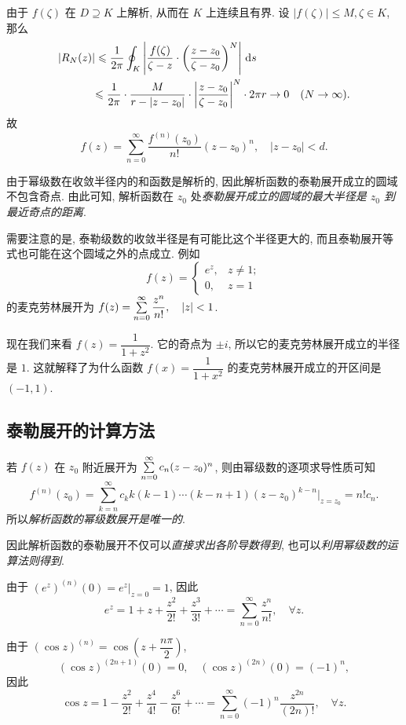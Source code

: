 由于 $f(\zeta)$ 在 $D\supseteq K$ 上解析, 从而在 $K$ 上连续且有界.
设 $|f(\zeta)|\le M,\zeta\in K$,
那么
\begin{align*}
	|R_N(z)|&\leqslant\frac 1{2\pi}\oint_K\left|\frac{f(\zeta)}{\zeta-z}\cdot\left(\frac{z-z_0}{\zeta-z_0}\right)^N\right|\,\mathrm{d} s\\
	&{\leqslant\frac 1{2\pi}\cdot \frac M{r-|z-z_0|}\cdot\left|\frac{z-z_0}{\zeta-z_0}\right|^N\cdot 2\pi r\to 0\quad (N\to\infty).}
\end{align*}
故
\[f(z)=\sum_{n=0}^\infty\frac{f^{(n)}(z_0)}{n!}(z-z_0)^n,\quad |z-z_0|<d.\]

由于幂级数在收敛半径内的和函数是解析的, 因此解析函数的泰勒展开成立的圆域不包含奇点.
由此可知, 解析函数在 $z_0$ 处\emph{泰勒展开成立的圆域的最大半径是 $z_0$ 到最近奇点的距离}.

需要注意的是, 泰勒级数的收敛半径是有可能比这个半径更大的,
而且泰勒展开等式也可能在这个圆域之外的点成立.
例如 
\[f(z)=\begin{cases}
	e^z,&z\neq 1;\\
	0,&z=1
\end{cases}\]
的麦克劳林展开为 $f(z)=\sum\limits_{n=0}^\infty \dfrac{z^n}{n!},\quad |z|<1$.

现在我们来看 $f(z)=\dfrac1{1+z^2}$.
它的奇点为 $\pm i$, 所以它的麦克劳林展开成立的半径是 $1$.
这就解释了为什么函数 $f(x)=\dfrac1{1+x^2}$ 的麦克劳林展开成立的开区间是 $(-1,1)$.

\subsection{泰勒展开的计算方法}

若 $f(z)$ 在 $z_0$ 附近展开为 $\sum\limits_{n=0}^\infty c_n(z-z_0)^n$,
则由幂级数的逐项求导性质可知
\[f^{(n)}(z_0)=\sum_{k=n}^\infty c_k k(k-1)\cdots(k-n+1)(z-z_0)^{k-n}\Big|_{z=z_0}=n!c_n.\]
所以\emph{解析函数的幂级数展开是唯一的}.

因此解析函数的泰勒展开不仅可以\emph{直接求出各阶导数得到}, 也可以\emph{利用幂级数的运算法则得到}.

\begin{example}
	由于 $(e^z)^{(n)}(0)=e^z|_{z=0}=1$, 因此
	\[e^z=1+z+\frac{z^2}{2!}+\frac{z^3}{3!}+\cdots=\sum_{n=0}^\infty\frac{z^n}{n!},\quad\forall z.\]
\end{example}

\begin{example}
	由于 $\displaystyle(\cos z)^{(n)}=\cos\left(z+\dfrac{n\pi}2\right)$,
		\[(\cos z)^{(2n+1)}(0)=0,\quad (\cos z)^{(2n)}(0)=(-1)^n,\]
	因此
		\[\cos z=1-\frac{z^2}{2!}+\frac{z^4}{4!}-\frac{z^6}{6!}+\cdots=\sum_{n=0}^\infty(-1)^n\frac{z^{2n}}{(2n)!},\quad\forall z.\]
\end{example}

